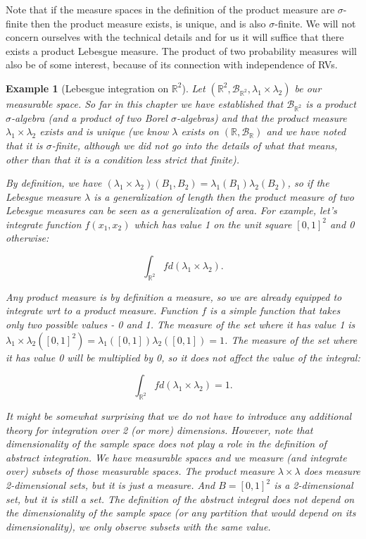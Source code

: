 \documentclass{book}
\theoremstyle{plain}%
\newtheorem{prototheorem}{Example}[section]
\newenvironment{cexample}
   {\colorlet{shadecolor}{gray!10}\begin{shaded}\begin{prototheorem}}
   {\end{prototheorem}\end{shaded}}
\theoremstyle{definition}
\begin{document}
Note that if the measure spaces in the definition of the product measure are $\sigma$-finite then the product measure exists, is unique, and is also $\sigma$-finite. We will not concern ourselves with the technical details and for us it will suffice that there exists a product Lebesgue measure. The product of two probability measures will also be of some interest, because of its connection with independence of RVs.

\begin{cexample}[Lebesgue integration on $\mathbb{R}^2$] Let $(\mathbb{R}^2, \mathcal{B}_{\mathbb{R}^2}, \lambda_1 \times \lambda_2)$ be our measurable space. So far in this chapter we have established that $\mathcal{B}_{\mathbb{R}^2}$ is a product $\sigma$-algebra (and a product of two Borel $\sigma$-algebras) and that the product measure $\lambda_1 \times \lambda_2$ exists and is unique (we know $\lambda$ exists on $(\mathbb{R}, \mathcal{B}_{\mathbb{R}})$ and we have noted that it is $\sigma$-finite, although we did not go into the details of what that means, other than that it is a condition less strict that finite).

By definition, we have $(\lambda_1 \times \lambda_2)(B_1, B_2) = \lambda_1(B_1)\lambda_2(B_2)$, so if the Lebesgue measure $\lambda$ is a generalization of length then the product measure of two Lebesgue measures can be seen as a generalization of area. For example, let's integrate function $f(x_1, x_2)$ which has value 1 on the unit square $[0, 1]^2$ and 0 otherwise:

$$\int_{\mathbb{R}^2} f d(\lambda_1 \times \lambda_2).$$

Any product measure is by definition a measure, so we are already equipped to integrate wrt to a product measure. Function $f$ is a simple function that takes only two possible values - 0 and 1. The measure of the set where it has value 1 is $\lambda_1 \times \lambda_2([0, 1]^2) = \lambda_1([0, 1]) \lambda_2([0, 1])= 1$. The measure of the set where it has value 0 will be multiplied by 0, so it does not affect the value of the integral:

$$\int_{\mathbb{R}^2} f d(\lambda_1 \times \lambda_2) = 1.$$

It might be somewhat surprising that we do not have to introduce any additional theory for integration over 2 (or more) dimensions. However, note that dimensionality of the sample space does not play a role in the definition of abstract integration. We have measurable spaces and we measure (and integrate over) subsets of those measurable spaces. The product measure $\lambda \times \lambda$ does measure 2-dimensional sets, but it is just a measure. And $B = [0, 1]^2$ is a 2-dimensional set, but it is still a set. The definition of the abstract integral does not depend on the dimensionality of the sample space (or any partition that would depend on its dimensionality), we only observe subsets with the same value.
\end{cexample}
\end{document}
